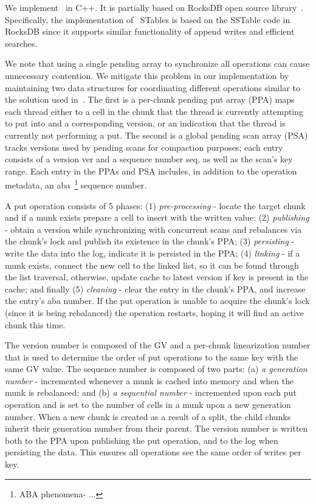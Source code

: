 We implement \sys\ in C++. It is partially based on RocksDB open source library~\cite{RocksDB}.
Specifically, the implementation of \sys\ STables is based on the SSTable code in RocksDB since it supports similar functionality of append writes and efficient searches. 

We note that using a single pending array to synchronize all
operations can cause unnecessary contention.
We mitigate this problem in our implementation by maintaining two data structures for coordinating different operations similar to the solution used in~\cite{kiwi}. The first is a per-chunk pending put array (PPA) maps each thread either to a cell in the chunk that the thread is currently attempting to put into and a corresponding version, or an indication that the thread is currently not performing a put. The second is a global pending scan array (PSA) tracks versions used by pending scans for compaction purposes; each entry consists of a version ver and a sequence number seq, as well as the scan’s key range. Each entry in the PPAs and PSA includes, in addition to the operation metadata, an aba~\footnote{ABA phenomena- ...} sequence number. 

A put operation consists of 5 phases: (1) \emph{pre-processing} - locate the target chunk and if a munk exists prepare a cell to insert with the written value; (2) \emph{publishing} - obtain a version while synchronizing with concurrent scans and rebalances via the chunk's lock and publish its existence in the chunk's PPA; (3) \emph{persisting} - write the data into the log, indicate it is persisted in the PPA; (4) \emph{linking} - if a munk exists, connect the new cell to the linked list, so it can be found through the list traversal, otherwise, update cache to latest version if key is present in the cache; and finally (5) \emph{cleaning} - clear the entry in the chunk's PPA, and increase the entry's aba number.
If the put operation is unable to acquire the chunk's lock (since it is being rebalanced) the operation restarts, hoping it will find an active chunk this time.

The version number is composed of the GV and a per-chunk linearization number that is used to determine the order of put operations to the same key with the same GV value.  The sequence number is composed of two parts: (a) \emph{a generation number} - incremented whenever a munk is cached into memory and when the munk is rebalanced; and (b) \emph{a sequential number} - incremented upon each put operation and is set to the number of cells in a munk upon a new generation number. When a new chunk is created as a result of a split, the child chunks inherit their generation number from their parent. The version number is written both to the PPA upon publishing the put operation, and to the log when persisting the data. This ensures all operations see the same order of writes per key.

